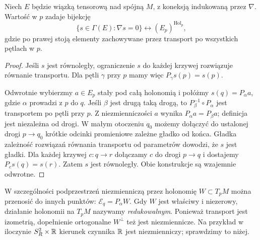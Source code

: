 \begin{stwierdzenie}
\label{prop:zasada-holonomii}
Niech $E$ będzie wiązką tensorową nad spójną $M$,
z koneksją indukowaną przez $\nabla$. Wartość w $p$
zadaje bijekcję
\[
 \{s\in\Gamma(E):\nabla s=0\}
 \longleftrightarrow (E_p)^{\operatorname{Hol}_p},
\]
gdzie po prawej stoją elementy zachowywane przez
transport po wszystkich pętlach w $p$.
\end{stwierdzenie}
\begin{proof}
Jeśli $s$ jest równoległy, ograniczenie $s$ do każdej
krzywej rozwiązuje równanie transportu. Dla pętli
$\gamma$ przy $p$ mamy więc $P_\gamma s(p)=s(p)$.

Odwrotnie wybierzmy $a\in E_p$ stały pod całą
holonomią i połóżmy $s(q)=P_\alpha a$, gdzie
$\alpha$ prowadzi z $p$ do $q$. Jeśli $\beta$ jest
drugą taką drogą, to $P_\beta^{-1}\circ P_\alpha$
jest transportem po pętli przy $p$. Z niezmienniczości
$a$ wynika $P_\alpha a=P_\beta a$; definicja jest
niezależna od drogi. W małym otoczeniu $q_0$ możemy
dołączyć do ustalonej drogi $p\to q_0$ krótkie odcinki
promieniowe zależne gładko od końca. Gładka zależność
rozwiązań równania transportu od parametrów dowodzi,
że $s$ jest gładki. Dla każdej krzywej $c:q\to r$
dołączamy $c$ do drogi $p\to q$ i dostajemy
$P_c s(q)=s(r)$. Zatem $s$ jest równoległy.
Obie konstrukcje są wzajemnie odwrotne.
\end{proof}

W szczególności podprzestrzeń niezmienniczą przez holonomię
$W\subset T_pM$ można przenosić do innych punktów:
$\mathcal E_q=P_\alpha W$. Gdy $W$ jest właściwy
i niezerowy, działanie holonomii na $T_pM$ nazywamy
\emph{redukowalnym}. Ponieważ transport jest izometrią,
dopełnienie ortogonalne $W^\perp$ też jest niezmiennicze.
Na przykład w iloczynie $S_R^2\times\mathbb{R}$ kierunek
czynnika $\mathbb{R}$ jest niezmienniczy; sprawdzimy to niżej.

